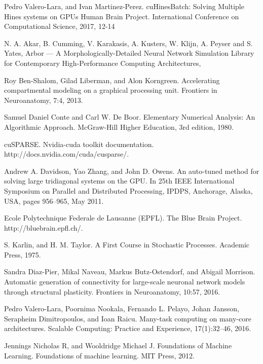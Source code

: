 \clearpage
\newpage
{} %
\begin{thebibliography}{1}
  Pedro Valero-Lara, and Ivan Martinez-Perez.
  cuHinesBatch: Solving Multiple Hines systems on GPUs Human Brain Project. 
  International Conference on Computational 
  Science, 2017, 12-14

  N. A. Akar, B. Cumming, V. Karakasis, A. Kusters, W. Klijn, A. Peyser and S. Yates,
  Arbor --- A Morphologically-Detailed Neural Network Simulation Library for Contemporary High-Performance Computing Architectures,

  Roy Ben-Shalom, Gilad Liberman, and Alon Korngreen. Accelerating compartmental modeling
  on a graphical processing unit. Frontiers in Neuroanatomy, 7:4, 2013.

  Samuel Daniel Conte and Carl W. De Boor. Elementary Numerical Analysis: An Algorithmic
  Approach. McGraw-Hill Higher Education, 3rd edition, 1980.

  cuSPARSE. Nvidia-cuda toolkit documentation. http://docs.nvidia.com/cuda/cusparse/.

  Andrew A. Davidson, Yao Zhang, and John D. Owens. An auto-tuned method for solving large
tridiagonal systems on the GPU. In 25th IEEE International Symposium on Parallel and Distributed
  Processing, IPDPS, Anchorage, Alaska, USA, pages 956–965, May 2011.
  
  Ecole Polytechnique Federale de Lausanne (EPFL). The Blue Brain Project.
  http://bluebrain.epfl.ch/.

  S. Karlin, and H. M. Taylor. A First Course in Stochastic Processes. Academic Press, 1975.

  Sandra Diaz-Pier, Mikal Naveau, Markus Butz-Ostendorf, and Abigail Morrison. Automatic generation
  of connectivity for large-scale neuronal network models through structural plasticity. Frontiers
  in Neuroanatomy, 10:57, 2016.

  Pedro Valero-Lara, Poornima Nookala, Fernando L. Pelayo, Johan Jansson, Serapheim Dimitropoulos,
  and Ioan Raicu. Many-task computing on many-core architectures. Scalable Computing:
  Practice and Experience, 17(1):32–46, 2016.

  Jennings Nicholas R, and Wooldridge Michael J. Foundations of Machine Learning. Foundations of machine learning. MIT Press, 2012.


\end{thebibliography}
